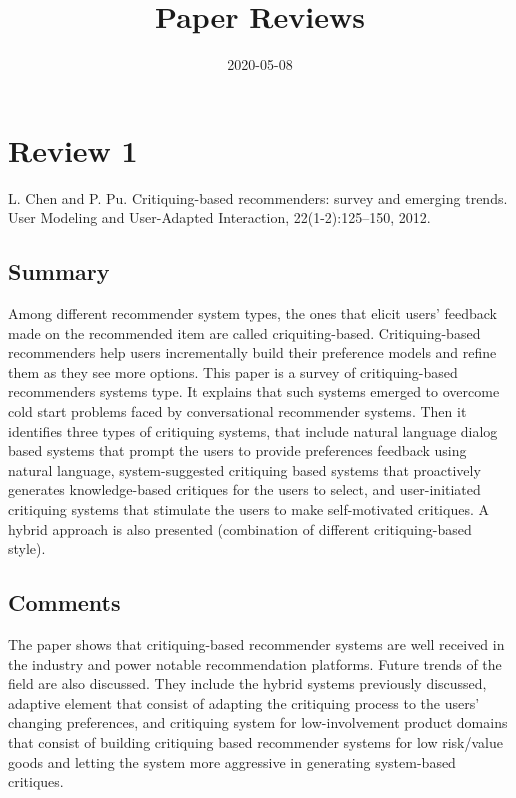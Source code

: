 \documentclass{article}
\begin{document}
\title{Paper Reviews}
\date{2020-05-08}
\maketitle

\section*{Review 1}
L. Chen and P. Pu. Critiquing-based recommenders: survey and emerging trends.
 User Modeling and User-Adapted Interaction, 22(1-2):125–150, 2012.

\subsection*{Summary}

Among different  recommender system types, the ones that elicit users’ feedback
made on the recommended item are called criquiting-based. Critiquing-based 
recommenders help users incrementally build their preference models and refine
them as they see more options. This paper is a survey of critiquing-based
recommenders systems type. It explains that such systems emerged to overcome
cold start problems faced by conversational recommender systems. Then it
identifies three types of critiquing systems, that include natural language
dialog based systems that prompt the users to provide preferences feedback
using natural language, system-suggested critiquing based systems that
proactively generates knowledge-based critiques for the users to select, and
user-initiated critiquing systems that stimulate the users to make
self-motivated critiques. A hybrid approach is also presented (combination
 of different critiquing-based style). 

\subsection*{Comments}

The paper shows that critiquing-based recommender systems are well received
in the industry and power notable recommendation platforms. Future trends of
the field are also discussed. They include the  hybrid systems previously
discussed, adaptive element that consist of adapting the critiquing process
to the users’ changing preferences, and critiquing system for low-involvement
product domains  that consist of building critiquing based recommender systems
for low risk/value goods and letting the system more aggressive in generating
system-based critiques.
\end{document}
